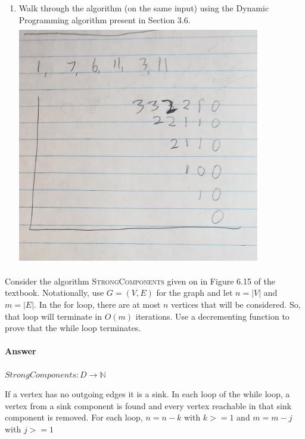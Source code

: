 \documentclass{article}
\begin{document}
\begin{enumerate}
    \item
        Walk through the algorithm (on the same input) using the Dynamic Programming algorithm
        present in Section 3.6.\\
        \includegraphics[width=400,height=400,keepaspectratio]{DynamicLIS.jpg}

\end{enumerate}

\collab{\todo{}}

Consider the algorithm \textsc{StrongComponents} given on in Figure 6.15 of the
textbook. Notationally, use $G=(V,E)$ for the graph and let $n=|V|$ and $m=|E|$.
In the for loop, there are at most $n$ vertices that will be
considered. So, that loop will terminate in $O(m)$ iterations.
Use a decrementing function to prove that the while loop terminates.

\paragraph{Answer}

$StrongComponents: D \rightarrow \mathbb{N}$

If a vertex has no outgoing edges it is a sink. In each loop of the while loop,
a vertex from a sink component is found and every vertex reachable in that sink
component is removed. For each loop, $n = n - k$ with $k >= 1$ and $m= m -j$ with $j >= 1$
\end{document}

